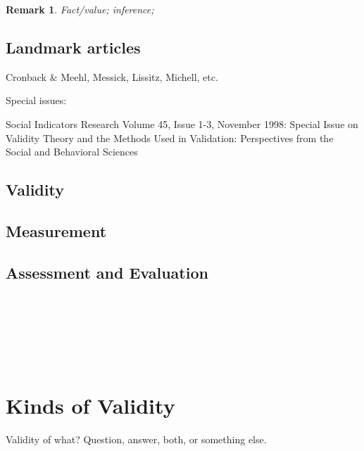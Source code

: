 \documentclass[11pt,twoside]{article}
\newtheorem{remark}{Remark}
\begin{document}
\begin{remark}
Fact/value; inference; 
\end{remark}

\subsection{Landmark articles}

Cronback \& Meehl, Messick, Lissitz, Michell, etc.

Special issues:

Social Indicators Research Volume 45, Issue 1-3, November 1998:  Special Issue on Validity Theory and the Methods Used in Validation: Perspectives from the Social and Behavioral Sciences

\noindent
\cite{schwarz_is_2009}

\subsection{Validity}

\subsection{Measurement}

\subsection{Assessment and Evaluation}

\noindent
\cite{brinkmann_factval_2005} \\
\cite{cicourel_interviews_1982} \\
\cite{hood_validity_2009} \\
\cite{mcdonald_measuring_2011} \\
\cite{messick_validity_1995} \\
\cite{putnam_collapse_2002}

\section{Kinds of Validity}
\label{sub:ValidityKinds}

Validity of what?  Question, answer, both, or something else.
\end{document}
